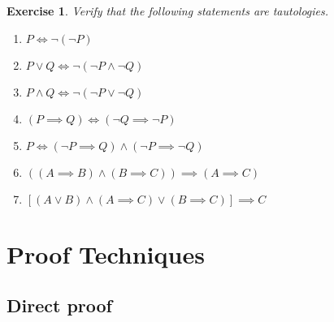 \documentclass{article}[12pt]
\newtheorem{exercise}{Exercise}[section]
\begin{document}
        \begin{exercise}
            Verify that the following statements are tautologies.
            
            \begin{multicols}{2}
            \begin{enumerate}
                \item
                $P \iff \neg (\neg P)$
                
                \item 
                $P \lor Q  \iff \neg (\neg P \land \neg Q)$
                
                \item
                $P \land Q \iff \neg (\neg P \lor \neg Q)$
                
                \item\label{eqn:contraposition}
                $(P \implies Q) \iff (\neg Q \implies \neg P)$
                
                \item \label{eqn:contradiction}
                $P \iff (\neg P \implies Q) \land (\neg P \implies \neg Q)$
                
                \item
                $((A \implies B) \land (B \implies C)) \implies (A \implies C)$
                
                \item\label{eqn:pf-cases}
                $[(A \lor B) \land (A \implies C) \lor (B \implies C)] \implies C$

            \end{enumerate}
            \end{multicols}
            
        \end{exercise}
        
    \section{Proof Techniques}
        
        
    \subsection{Direct proof}
    
\end{document}

